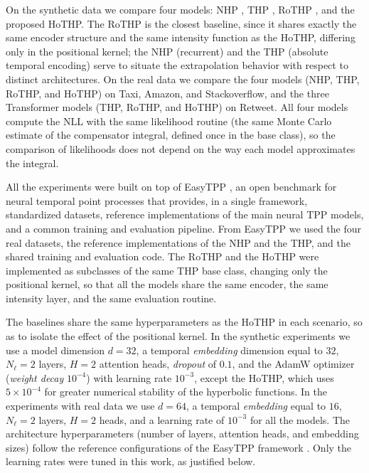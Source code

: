 On the synthetic data we compare four models: NHP \cite{mei_neural_2017}, THP \cite{zuo_transformer_2021}, RoTHP \cite{dai_rotary_2026}, and the proposed HoTHP. The RoTHP is the closest baseline, since it shares exactly the same encoder structure and the same intensity function as the HoTHP, differing only in the positional kernel; the NHP (recurrent) and the THP (absolute temporal encoding) serve to situate the extrapolation behavior with respect to distinct architectures. On the real data we compare the four models (NHP, THP, RoTHP, and HoTHP) on Taxi, Amazon, and Stackoverflow, and the three Transformer models (THP, RoTHP, and HoTHP) on Retweet. All four models compute the NLL with the same likelihood routine (the same Monte Carlo estimate of the compensator integral, defined once in the base class), so the comparison of likelihoods does not depend on the way each model approximates the integral.

All the experiments were built on top of EasyTPP \cite{xue_easytpp_2024}, an open benchmark for neural temporal point processes that provides, in a single framework, standardized datasets, reference implementations of the main neural TPP models, and a common training and evaluation pipeline. From EasyTPP we used the four real datasets, the reference implementations of the NHP and the THP, and the shared training and evaluation code. The RoTHP and the HoTHP were implemented as subclasses of the same THP base class, changing only the positional kernel, so that all the models share the same encoder, the same intensity layer, and the same evaluation routine.

The baselines share the same hyperparameters as the HoTHP in each scenario, so as to isolate the effect of the positional kernel. In the synthetic experiments we use a model dimension $d = 32$, a temporal \textit{embedding} dimension equal to $32$, $N_{\ell} = 2$ layers, $H = 2$ attention heads, \textit{dropout} of $0.1$, and the AdamW optimizer (\textit{weight decay} $10^{-4}$) with learning rate $10^{-3}$, except the HoTHP, which uses $5 \times 10^{-4}$ for greater numerical stability of the hyperbolic functions. In the experiments with real data we use $d = 64$, a temporal \textit{embedding} equal to $16$, $N_{\ell} = 2$ layers, $H = 2$ heads, and a learning rate of $10^{-3}$ for all the models. The architecture hyperparameters (number of layers, attention heads, and embedding sizes) follow the reference configurations of the EasyTPP framework \cite{xue_easytpp_2024}. Only the learning rates were tuned in this work, as justified below.

